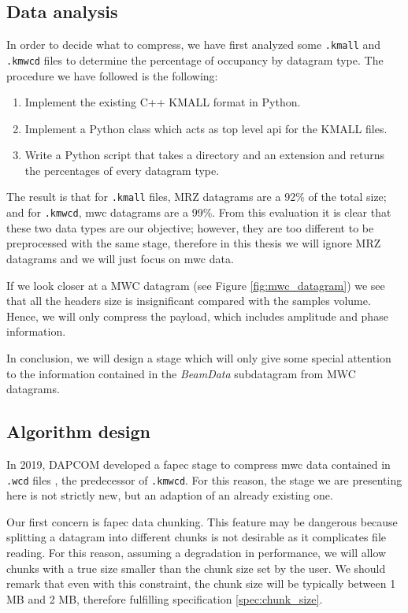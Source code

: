 \subsection{Data analysis} \label{sec:kmall_analysis}
In order to decide what to compress, we have first analyzed some \texttt{.kmall} and \texttt{.kmwcd} files to determine the percentage of occupancy by datagram type. The procedure we have followed is the following:
\begin{enumerate}
	\item Implement the existing C++ KMALL format in Python.
	\item Implement a Python class which acts as top level \acrshort{api} for the KMALL files.
	\item Write a Python script that takes a directory and an extension and returns the percentages of every datagram type.
\end{enumerate}
The result is that for \texttt{.kmall} files, MRZ datagrams are a 92\% of the total size; and for \texttt{.kmwcd}, \acrshort{mwc} datagrams are a 99\%. From this evaluation it is clear that these two data types are our objective; however, they are too different to be preprocessed with the same stage, therefore in this thesis we will ignore MRZ datagrams and we will just focus on \acrshort{mwc} data.

If we look closer at a MWC datagram (see Figure \ref{fig:mwc_datagram}) we see that all the headers size is insignificant compared with the samples volume. Hence, we will only compress the payload, which includes amplitude and phase information.

In conclusion, we will design a stage which will only give some special attention to the information contained in the \textit{BeamData} subdatagram from MWC datagrams.

\subsection{Algorithm design}
In 2019, DAPCOM developed a \acrshort{fapec} stage to compress \acrshort{mwc} data contained in \texttt{.wcd} files \parencite{Portell2019}, the predecessor of \texttt{.kmwcd}. For this reason, the stage we are presenting here is not strictly new, but an adaption of an already existing one.

Our first concern is \acrshort{fapec} data chunking. This feature may be dangerous because splitting a datagram into different chunks is not desirable as it complicates file reading. For this reason, assuming a degradation in performance, we will allow chunks with a true size smaller than the chunk size set by the user. We should remark that even with this constraint, the chunk size will be typically between 1 MB and 2 MB, therefore fulfilling specification \ref{spec:chunk_size}.

